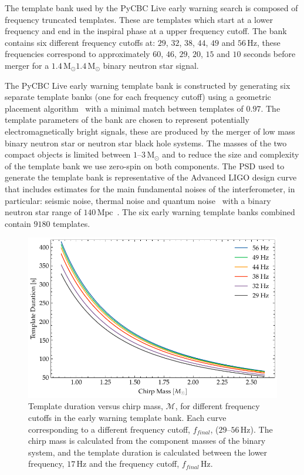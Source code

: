 The template bank used by the PyCBC Live early warning search is composed of frequency truncated templates. These are \gwadj templates which start at a lower frequency and end in the inspiral phase at a upper frequency cutoff. The bank contains six different frequency cutoffs at: $29$, $32$, $38$, $44$, $49$ and $56 \, \text{Hz}$, these frequencies correspond to approximately $60$, $46$, $29$, $20$, $15$ and $10$ seconds before merger for a $1.4 \, \text{M$_\odot$}$\text{--}$1.4\, \text{M$_\odot$}$ binary neutron star signal.

The PyCBC Live early warning template bank is constructed by generating six separate template banks (one for each frequency cutoff) using a geometric placement algorithm~\cite{Brown:2012} with a minimal match between templates of $0.97$. The template parameters of the bank are chosen to represent potentially electromagnetically bright signals, these are produced by the merger of low mass binary neutron star or neutron star black hole systems. The masses of the two compact objects is limited between $1\text{--}3 \, \text{M$_\odot$}$ and to reduce the size and complexity of the template bank we use zero-spin on both components. The PSD used to generate the template bank is representative of the Advanced LIGO design curve that includes estimates for the main fundamental noises of the interferometer, in particular: seismic noise, thermal noise and quantum noise~\cite{aLIGO_design_curve:2018} with a binary neutron star range of $140 \, \text{Mpc}$~\cite{ligo_prospects:2016}. The six early warning template banks combined contain $9180$ templates.
%
\begin{figure}
    \centering
    \includegraphics[width=\textwidth]{images/6_earlywarning/search/template_bank_duration_mchirp.pdf}
    \caption{Template duration versus chirp mass, $\mathcal{M}$, for different frequency cutoffs in the early warning template bank. Each curve corresponding to a different frequency cutoff, $f_{final}$, ($29\text{--}56  \, \text{Hz}$). The chirp mass is calculated from the component masses of the binary system, and the template duration is calculated between the lower frequency, $17 \, \text{Hz}$ and the frequency cutoff, $f_{final} \, \text{Hz}$.}
    \label{6:fig:tb_duration_mchirp}
\end{figure}
